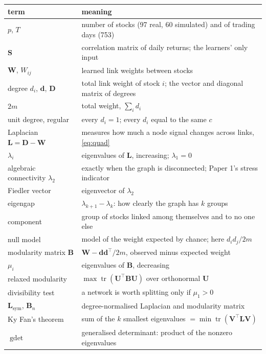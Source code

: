 \documentclass[11pt,a4paper]{article}
\newcommand{\Lap}{\mathbf{L}}
\newcommand{\Wmat}{\mathbf{W}}
\newcommand{\Bmat}{\mathbf{B}}
\newcommand{\Dmat}{\mathbf{D}}
\newcommand{\Smat}{\mathbf{S}}
\newcommand{\Vmat}{\mathbf{V}}
\newcommand{\Umat}{\mathbf{U}}
\newcommand{\dvec}{\mathbf{d}}
\newcommand{\tr}{\operatorname{tr}}
\newcommand{\Lsym}{\Lap_{\mathrm{sym}}}
\newcommand{\gdet}{\operatorname{gdet}}
\theoremstyle{remark}
\begin{document}
\begin{center}
\small
\renewcommand{\arraystretch}{1.15}
\begin{tabular}{>{\raggedright\arraybackslash}p{3.6cm}>{\raggedright\arraybackslash}p{11.0cm}}
\toprule
term & meaning \\
\midrule
$p$, $T$ & number of stocks (97 real, 60 simulated) and of trading days (753) \\
$\Smat$ & correlation matrix of daily returns; the learners' only input \\
$\Wmat$, $W_{ij}$ & learned link weights between stocks \\
degree $d_i$, $\dvec$, $\Dmat$ & total link weight of stock $i$; the vector and diagonal matrix of degrees \\
$2m$ & total weight, $\sum_id_i$ \\
unit degree, regular & every $d_i=1$; every $d_i$ equal to the same $c$ \\
Laplacian $\Lap=\Dmat-\Wmat$ & measures how much a node signal changes across links, \eqref{eq:quad} \\
$\lambda_i$ & eigenvalues of $\Lap$, increasing; $\lambda_1=0$ \\
algebraic connectivity $\lambda_2$ & 0 exactly when the graph is disconnected; Paper 1's stress indicator \\
Fiedler vector & eigenvector of $\lambda_2$ \\
eigengap & $\lambda_{k+1}-\lambda_k$: how clearly the graph has $k$ groups \\
component & group of stocks linked among themselves and to no one else \\
null model & model of the weight expected by chance; here $d_id_j/2m$ \\
modularity matrix $\Bmat$ & $\Wmat-\dvec\dvec^\top/2m$, observed minus expected weight \\
$\mu_i$ & eigenvalues of $\Bmat$, decreasing \\
relaxed modularity & $\max\tr(\Umat^\top\Bmat\Umat)$ over orthonormal $\Umat$ \\
divisibility test & a network is worth splitting only if $\mu_1>0$ \\
$\Lsym$, $\Bmat_n$ & degree-normalised Laplacian and modularity matrix \\
Ky Fan's theorem & sum of the $k$ smallest eigenvalues $=\min\tr(\Vmat^\top\Lap\Vmat)$ \\
$\gdet$ & generalised determinant: product of the nonzero eigenvalues \\

\end{tabular}
\end{center}
\end{document}
